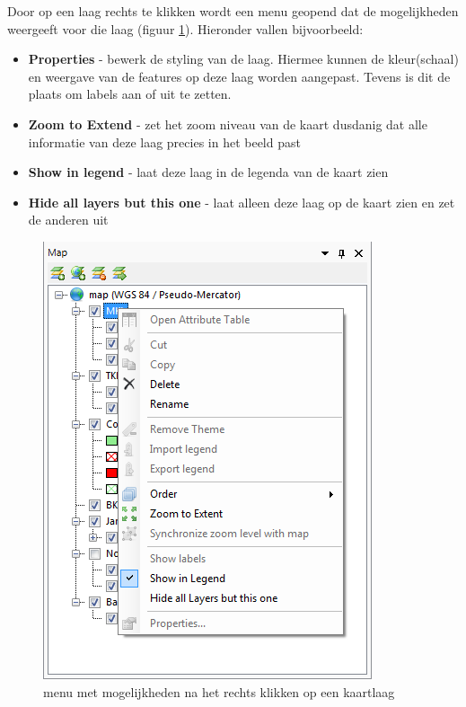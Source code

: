 Door op een laag rechts te klikken wordt een menu geopend dat de mogelijkheden weergeeft voor die laag (figuur \ref{fig:MapLayer_Context_Menu}). Hieronder vallen bijvoorbeeld:
\begin{itemize}
\item \textbf{Properties} - bewerk de styling van de laag. Hiermee kunnen de kleur(schaal) en weergave van de features op deze laag worden aangepast. Tevens is dit de plaats om labels aan of uit te zetten.
\item \textbf{Zoom to Extend} - zet het zoom niveau van de kaart dusdanig dat alle informatie van deze laag precies in het beeld past
\item \textbf{Show in legend} - laat deze laag in de legenda van de kaart zien
\item \textbf{Hide all layers but this one} - laat alleen deze laag op de kaart zien en zet de anderen uit
\end{itemize}

\begin{figure}[h!]
	\centering
		\includegraphics{figures/chapter_general/rt_MapLayer_Context_Menu.png}
		\caption{menu met mogelijkheden na het rechts klikken op een kaartlaag}
	\label{fig:MapLayer_Context_Menu}
\end{figure}

